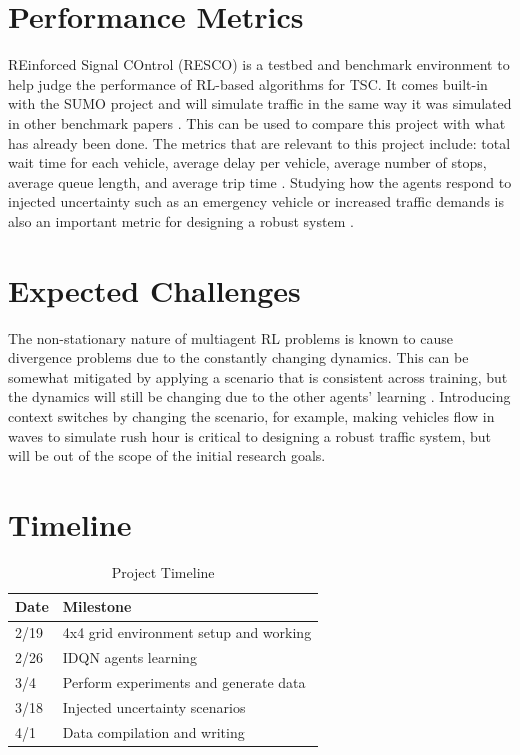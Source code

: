 \documentclass[letterpaper]{article} %
\begin{document}
\section{Performance Metrics}
REinforced Signal COntrol (RESCO) is a testbed and benchmark environment to help judge the performance of RL-based algorithms for TSC. It comes built-in with the SUMO project and will simulate traffic in the same way it was simulated in other benchmark papers \cite{ault2021reinforcement}. This can be used to compare this project with what has already been done.
The metrics that are relevant to this project include: total wait time for each vehicle, average delay per vehicle, average number of stops, average queue length, and average trip time \cite{Reza2023}.
Studying how the agents respond to injected uncertainty such as an emergency vehicle or increased traffic demands is also an important metric for designing a robust system \cite{DBLP:journals/corr/abs-2004-04778}.

\section{Expected Challenges}
The non-stationary nature of multiagent RL problems is known to cause divergence problems due to the constantly changing dynamics.
This can be somewhat mitigated by applying a scenario that is consistent across training, but the dynamics will still be changing due to the other agents' learning \cite{DBLP:journals/corr/abs-2004-04778}.
Introducing context switches by changing the scenario, for example, making vehicles flow in waves to simulate rush hour is critical to designing a robust traffic system, but will be out of the scope of the initial research goals.

\section{Timeline}

\begin{table}[H]
\centering
\begin{tabular}{ll}
\hline
\textbf{Date} & \textbf{Milestone}             \\ \hline
2/19 & 4x4 grid environment setup and working  \\
2/26 & IDQN agents learning                    \\
3/4  & Perform experiments and generate data   \\
3/18 & Injected uncertainty scenarios          \\
4/1  & Data compilation and writing            \\ \hline
\end{tabular}
\caption{Project Timeline}
\label{tab:project_timeline}
\end{table}
\end{document}
